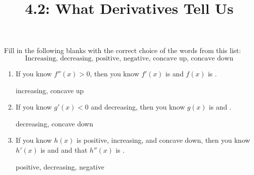 \documentclass[nooutcomes,handout]{ximera}
\title{4.2: What Derivatives Tell Us}
\begin{document}
\begin{abstract}		\end{abstract}
\maketitle

\begin{problem}
Fill in the following blanks with the correct choice of the words from this list:
$$ \text{Increasing, decreasing, positive, negative, concave up, concave down} $$

	\begin{enumerate}
	
	\item  If you know $f''(x) > 0$, then you know $f'(x)$ is \underline{\hspace{3cm}} and $f(x)$ is \underline{\hspace{3cm}}.
		\begin{freeResponse}
		increasing, concave up
		\end{freeResponse}
		
			
				
	\item  If you know $g'(x) < 0$ and decreasing, then you know $g(x)$ is \underline{\hspace{3cm}} and \underline{\hspace{3cm}}.
		\begin{freeResponse}
		decreasing, concave down
		\end{freeResponse}
		
			
				
	\item  If you know $h(x)$ is positive, increasing, and concave down, then you know $h'(x)$ is \underline{\hspace{3cm}} and \underline{\hspace{3cm}} and that $h''(x)$ is \underline{\hspace{3cm}}.
		\begin{freeResponse}
		positive, decreasing, negative
		\end{freeResponse}
		
			
				
	\end{enumerate}	
		
\end{problem}
\end{document}
